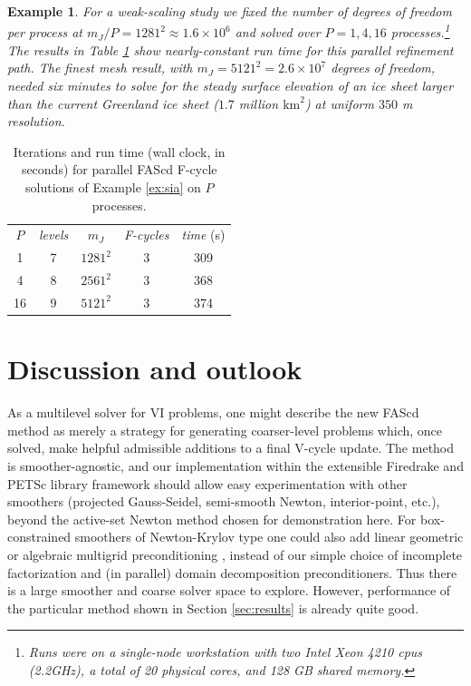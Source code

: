 \documentclass[letterpaper,final,12pt,reqno]{amsart}
\theoremstyle{cstyle}
\theoremstyle{cstyle*}
\theoremstyle{dstyle}
\newtheorem{example}[theorem]{Example}
\numberwithin{equation}{section}
\numberwithin{figure}{section}
\numberwithin{table}{section}
\numberwithin{theorem}{section}
\begin{document}
\begin{example}
For a weak-scaling study we fixed the number of degrees of freedom per process at $m_J/P=1281^2 \approx 1.6 \times 10^6$ and solved over $P=1,4,16$ processes.\footnote{Runs were on a single-node workstation with two Intel Xeon 4210 cpus (2.2GHz), a total of 20 physical cores, and 128 GB shared memory.}  The results in Table \ref{tab:results:siaweak} show nearly-constant run time for this parallel refinement path.  The finest mesh result, with $m_J=5121^2=2.6 \times 10^7$ degrees of freedom, needed six minutes to solve for the steady surface elevation of an ice sheet larger than the current Greenland ice sheet ($1.7$ million $\text{km}^2$) at uniform $350$ m resolution.
\end{example}

\begin{table}[ht]
\begin{tabular}{c@{\hskip 4mm}c@{\hskip 4mm}c@{\hskip 7mm}c@{\hskip 4mm}c}
$P$ & \emph{levels} & $m_J$ & \emph{F-cycles} & \emph{time} (s) \\ \cmidrule{1-5}
 1 & 7 & $1281^2$ & 3 & 309 \\
 4 & 8 & $2561^2$ & 3 & 368 \\
16 & 9 & $5121^2$ & 3 & 374
\end{tabular}
\bigskip
\caption{Iterations and run time (wall clock, in seconds) for parallel FAScd F-cycle solutions of Example \ref{ex:sia} on $P$ processes.}
\label{tab:results:siaweak}
\end{table}


\section{Discussion and outlook} \label{sec:discussion}

As a multilevel solver for VI problems, one might describe the new FAScd method as merely a strategy for generating coarser-level problems which, once solved, make helpful admissible additions to a final V-cycle update.  The method is smoother-agnostic, and our implementation within the extensible Firedrake \cite{Rathgeberetal2016} and PETSc \cite{Balayetal2023} library framework should allow easy experimentation with other smoothers (projected Gauss-Seidel, semi-smooth Newton, interior-point, etc.), beyond the active-set Newton method \cite{BensonMunson2006} chosen for demonstration here.  For box-constrained smoothers of Newton-Krylov type one could also add linear geometric or algebraic multigrid preconditioning \cite{Trottenbergetal2001}, instead of our simple choice of incomplete factorization and (in parallel) domain decomposition preconditioners.  Thus there is a large smoother and coarse solver space to explore.  However, performance of the particular method shown in Section \ref{sec:results} is already quite good.
\end{document}
